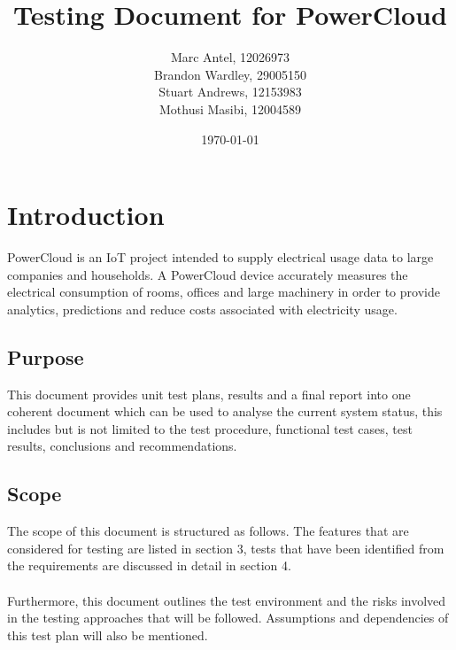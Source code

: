 \documentclass[a4paper,10pt]{article}
\title{Testing Document for PowerCloud}
\author{Marc Antel, 12026973\\ Brandon Wardley, 29005150\\ Stuart Andrews, 12153983\\ Mothusi Masibi, 12004589}
\date{\today}
\begin{document}
	\maketitle
	\newpage
	
	\section{Introduction}
	PowerCloud is an IoT project intended to supply electrical usage data to large companies and 
	households. A PowerCloud device accurately measures the electrical consumption of rooms, offices and 
	large machinery in order to provide analytics, predictions and reduce costs associated with electricity 
	usage.
	
		\subsection{Purpose}
		This document provides unit test plans, results and a final report into one coherent document which can be used to analyse the current system status, this includes but is not limited to the test procedure, functional test cases, test results, conclusions and recommendations.
		
		\subsection{Scope}
		The scope of this document is structured as 
		follows. The features that are considered for
		testing are listed in section 3, tests that have 
		been identified from the requirements are
		discussed in detail in section 4.\\\\Furthermore, 
		this document outlines the test environment
		and the risks involved in the testing approaches 
		that will be followed. Assumptions and
		dependencies of this test plan will also be 
		mentioned.
		
\end{document}
